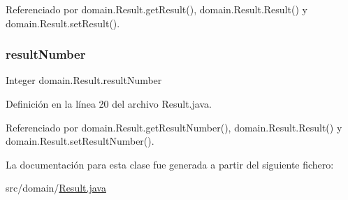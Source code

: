 Referenciado por domain.\+Result.\+get\+Result(), domain.\+Result.\+Result() y domain.\+Result.\+set\+Result().

\mbox{\label{classdomain_1_1Result_a395f320b24359857058e76236dd310a1}} 
\subsubsection{\texorpdfstring{resultNumber}{resultNumber}}
{\footnotesize\ttfamily Integer domain.\+Result.\+result\+Number\hspace{0.3cm}{\ttfamily [private]}}



Definición en la línea 20 del archivo Result.\+java.



Referenciado por domain.\+Result.\+get\+Result\+Number(), domain.\+Result.\+Result() y domain.\+Result.\+set\+Result\+Number().



La documentación para esta clase fue generada a partir del siguiente fichero\+:\begin{DoxyCompactItemize}
\item 
src/domain/\mbox{\hyperlink{Result_8java}{Result.\+java}}\end{DoxyCompactItemize}
